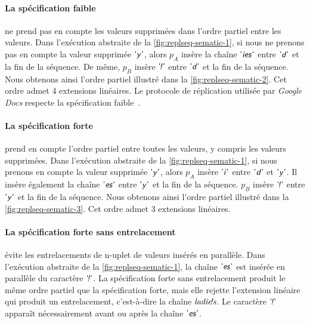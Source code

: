 \paragraph{La spécification faible}\autocite{attiyai_2016_spec-text-editing} ne prend pas en compte les valeurs supprimées dans l'ordre partiel entre les valeurs.
Dans l'exécution abstraite de la \autoref{fig:replseq-sematic-1}, si nous ne prenons pas en compte la valeur supprimée $\textsf{'\textit{y}'}$, alors $p_A$ insère la chaîne $\textsf{'\textit{ies}'}$ entre $\textsf{'\textit{d}'}$ et la fin de la séquence.
De même, $p_B$ insère $\textsf{'\textit{\negthinspace!}'}$ entre $\textsf{'\textit{d}'}$ et la fin de la séquence.
Nous obtenons ainsi l'ordre partiel illustré dans la \autoref{fig:replseq-sematic-2}.
Cet ordre admet 4 extensions linéaires.
Le protocole de réplication utilisée par \emph{Google Docs} respecte la spécification faible~\autocite{wei2018_jupiterweak}.

\paragraph{La spécification forte}\autocite{attiyai_2016_spec-text-editing} prend en  compte l'ordre partiel entre toutes les valeurs, y compris les valeurs supprimées.
Dans l'exécution abstraite de la \autoref{fig:replseq-sematic-1}, si nous prenons en compte la valeur supprimée $\textsf{'\textit{y}'}$, alors $p_A$ insère $\textsf{'\textit{i}'}$ entre $\textsf{'\textit{d}'}$ et $\textsf{'\textit{y}'}$.
Il insère également la chaîne $\textsf{'\textit{es}'}$ entre $\textsf{'\textit{y}'}$ et la fin de la séquence.
$p_B$ insère $\textsf{'\textit{\negthinspace!}'}$ entre $\textsf{'\textit{y}'}$ et la fin de la séquence.
Nous obtenons ainsi l'ordre partiel illustré dans la \autoref{fig:replseq-sematic-3}.
Cet ordre admet 3 extensions linéaires.

\paragraph{La spécification forte sans entrelacement}\autocite{kleppmann2019_interleaving,kleppmann2018opsets} évite les entrelacements de n-uplet de valeurs insérés en parallèle.
Dans l'exécution abstraite de la \autoref{fig:replseq-sematic-1}, la chaîne $\textsf{'\textit{es}'}$ est insérée en parallèle du caractère $\textsf{'\textit{\negthinspace!}'}$.
La spécification forte sans entrelacement produit le même ordre partiel que la spécification forte, mais elle rejette l'extension linéaire qui produit un entrelacement, c'est-à-dire la chaîne $\textit{ladie\textit{\negthinspace!}s}$.
Le caractère $\textsf{'\textit{\negthinspace!}'}$ apparaît nécessairement avant ou après la chaîne $\textsf{'\textit{es}'}$.

